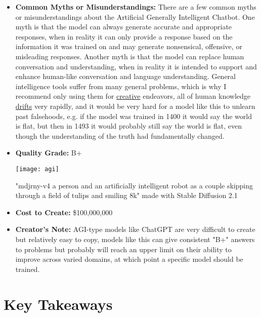 \begin{itemize}
    \item \textbf{Common Myths or Misunderstandings:} There are a few common myths or misunderstandings about the Artificial Generally Intelligent Chatbot. One myth is that the model can always generate accurate and appropriate responses, when in reality it can only provide a response based on the information it was trained on and may generate nonsensical, offensive, or misleading responses. Another myth is that the model can replace human conversation and understanding, when in reality it is intended to support and enhance human-like conversation and language understanding. General intelligence tools suffer from many general problems, which is why I recommend only using them for \hyperref[sec:creative]{creative} endeavors, all of human knowledge \hyperref[sec:drift]{drifts} very rapidly, and it would be very hard for a model like this to unlearn past falsehoods, e.g. if the model was trained in 1400 it would say the world is flat, but then in 1493 it would probably still say the world is flat, even though the understanding of the truth had fundamentally changed. 
    \item \textbf{Quality Grade:} B+
\begin{marginfigure}[-5.5cm]
        \texttt{[image: agi]}
        \caption{"mdjrny-v4 a person and an artificially intelligent robot as a couple skipping through a field of tulips and smiling 8k" made with Stable Diffusion 2.1}
\end{marginfigure}
    \item \textbf{Cost to Create:} \$100,000,000
    \item \textbf{Creator's Note:} AGI-type models like ChatGPT are very difficult to create but relatively easy to copy, models like this can give consistent "B+" answers to problems but probably will reach an upper limit on their ability to improve across varied domains, at which point a specific model should be trained.
\end{itemize}

\section{Key Takeaways}

